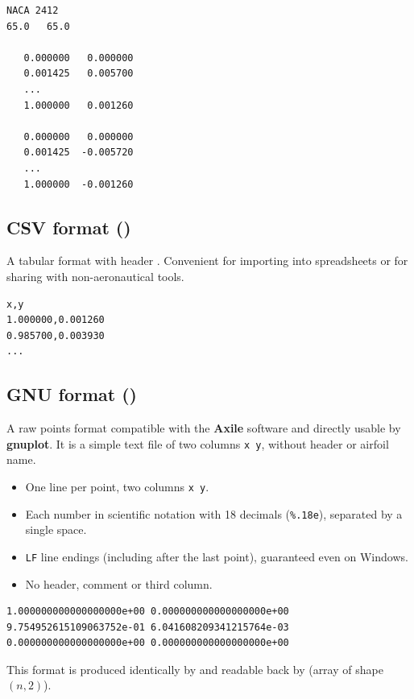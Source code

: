 \begin{lstlisting}[caption={Example Lednicer file}]
NACA 2412
65.0   65.0

   0.000000   0.000000
   0.001425   0.005700
   ...
   1.000000   0.001260

   0.000000   0.000000
   0.001425  -0.005720
   ...
   1.000000  -0.001260
\end{lstlisting}

\subsection{CSV format ()}

A tabular format with header . Convenient for
importing into spreadsheets or for sharing with
non-aeronautical tools.

\begin{lstlisting}[caption={Example CSV file}]
x,y
1.000000,0.001260
0.985700,0.003930
...
\end{lstlisting}

\subsection{GNU format ()}

A raw points format compatible with the \textbf{Axile} software and
directly usable by \textbf{gnuplot}. It is a simple
text file of two columns \texttt{x~y}, without header or airfoil name.

\begin{itemize}
    \item One line per point, two columns \texttt{x y}.
    \item Each number in scientific notation with 18 decimals
        (\texttt{\%.18e}), separated by a single space.
    \item \texttt{LF} line endings (including after the last point),
        guaranteed even on Windows.
    \item No header, comment or third column.
\end{itemize}

\begin{lstlisting}[caption={Example GNU file (.gnu)}]
1.000000000000000000e+00 0.000000000000000000e+00
9.754952615109063752e-01 6.041608209341215764e-03
0.000000000000000000e+00 0.000000000000000000e+00
\end{lstlisting}

This format is produced identically by  and
readable back by  (array of shape $(n, 2)$).

